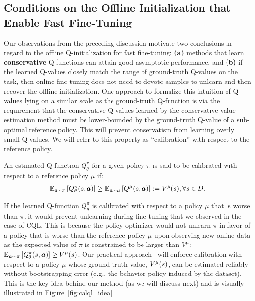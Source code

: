 \vspace{-0.1cm}
\subsection{Conditions on the Offline Initialization that Enable Fast Fine-Tuning}
\vspace{-0.18cm}
Our observations from the preceding discussion motivate two conclusions in regard to the offline Q-initialization for fast fine-tuning: \textbf{(a)} methods that learn \textbf{conservative} Q-functions can attain good asymptotic performance, and \textbf{(b)} if the learned Q-values closely match the range of ground-truth Q-values on the task, then online fine-tuning does not need to devote samples to unlearn and then recover the offline initialization. One approach to formalize this intuition of Q-values lying on a similar scale as the ground-truth Q-function is via the requirement that the conservative Q-values learned by the conservative value estimation method must be lower-bounded by the ground-truth Q-value of a sub-optimal reference policy. This will prevent conservatism from learning overly small Q-values. We will refer to this property as ``calibration'' with respect to the reference policy.
\begin{tcolorbox}[colback=blue!6!white,colframe=black,boxsep=0pt,top=-3pt,bottom=2pt]
\vspace{5mm}
\begin{definition}[Calibration]
\label{cond:calibration}
An estimated Q-function ${Q}_\theta^\pi$ for a given policy $\pi$ is said to be calibrated with respect to a reference policy $\mu$ if:
\begin{align} 
    \mathbb{E}_{\boldsymbol{a} \sim \pi}\left[Q_\theta^\pi(s, \boldsymbol{a})\right] \geq \mathbb{E}_{\boldsymbol{a} \sim \mu}\left[Q^\mu(s, \boldsymbol{a})\right] := V^\mu(s), \forall s \in \mathcal \mathcal{D}.
\end{align}
\end{definition}
\end{tcolorbox}

If the learned Q-function ${Q}^\pi_\theta$ is calibrated with respect to a policy $\mu$ that is worse than $\pi$, it would prevent unlearning during fine-tuning that we observed in the case of CQL.
This is because the policy optimizer would not unlearn $\pi$ in favor of a policy that is worse than the reference policy $\mu$ upon observing new online data as the expected value of $\pi$ is constrained to be larger than $V^\mu$: $\mathbb{E}_{\boldsymbol{a} \sim \pi}\left[{Q}^\pi_\theta(s, \boldsymbol{a})\right] \geq V^\mu(s)$.
Our practical approach \methodname\ will enforce calibration with respect to a policy $\mu$ whose ground-truth value, $V^\mu(s)$, can be estimated reliably without bootstrapping error (e.g., the behavior policy induced by the dataset). This is the key idea behind our method (as we will discuss next) and is visually illustrated in Figure~\ref{fig:calql_idea}.

\vspace{-0.2cm}